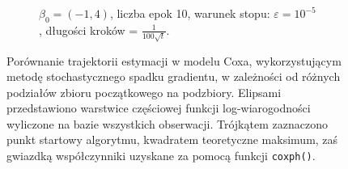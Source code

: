 \begin{figure}[hbt!]
\begin{center}
\begin{subfigure}[h!]{0.9\textwidth}
            \caption{$\beta_0=(-1,4)$, liczba epok 10, warunek stopu: $\varepsilon=10^{-5}$, długości kroków = $\frac{1}{100\sqrt{t}}$.}
   \end{subfigure}  
      \end{center}
  \caption[Porównanie estymacji w modelu Coxa metodą stochastycznego spadku gradientu dla różnych podziałów zbioru początkowego na podzbiory.]{\label{rysCox3}Porównanie trajektorii estymacji w modelu Coxa, wykorzystującym metodę stochastycznego spadku gradientu, w zależności od różnych podziałów zbioru początkowego na podzbiory. Elipsami przedstawiono warstwice częściowej funkcji log-wiarogodności wyliczone na bazie wszystkich obserwacji. Trójkątem zaznaczono punkt startowy algorytmu, kwadratem teoretyczne maksimum, zaś gwiazdką współczynniki uzyskane za pomocą funkcji \texttt{coxph()}.}
\end{figure}



